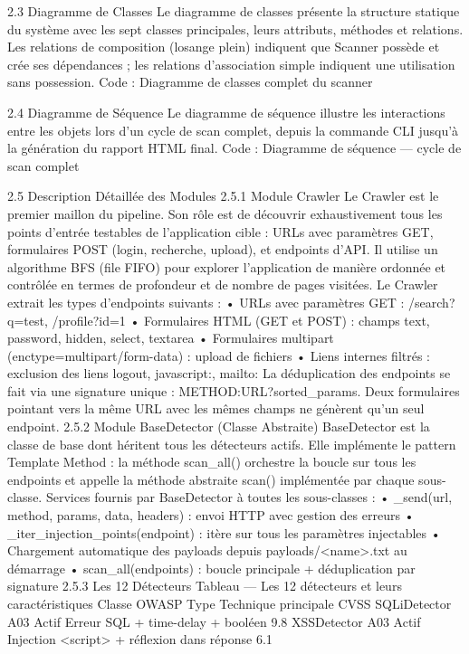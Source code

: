 2.3  Diagramme de Classes
Le diagramme de classes présente la structure statique du système avec les sept classes principales, leurs attributs, méthodes et relations. Les relations de composition (losange plein) indiquent que Scanner possède et crée ses dépendances ; les relations d'association simple indiquent une utilisation sans possession.
Code : Diagramme de classes complet du scanner
 
2.4  Diagramme de Séquence
Le diagramme de séquence illustre les interactions entre les objets lors d'un cycle de scan complet, depuis la commande CLI jusqu'à la génération du rapport HTML final.
Code : Diagramme de séquence — cycle de scan complet
 
2.5  Description Détaillée des Modules
2.5.1  Module Crawler
Le Crawler est le premier maillon du pipeline. Son rôle est de découvrir exhaustivement tous les points d'entrée testables de l'application cible : URLs avec paramètres GET, formulaires POST (login, recherche, upload), et endpoints d'API. Il utilise un algorithme BFS (file FIFO) pour explorer l'application de manière ordonnée et contrôlée en termes de profondeur et de nombre de pages visitées.
Le Crawler extrait les types d'endpoints suivants :
•	URLs avec paramètres GET : /search?q=test, /profile?id=1
•	Formulaires HTML (GET et POST) : champs text, password, hidden, select, textarea
•	Formulaires multipart (enctype=multipart/form-data) : upload de fichiers
•	Liens internes filtrés : exclusion des liens logout, javascript:, mailto:
La déduplication des endpoints se fait via une signature unique : METHOD:URL?sorted_params. Deux formulaires pointant vers la même URL avec les mêmes champs ne génèrent qu'un seul endpoint.
2.5.2  Module BaseDetector (Classe Abstraite)
BaseDetector est la classe de base dont héritent tous les détecteurs actifs. Elle implémente le pattern Template Method : la méthode scan_all() orchestre la boucle sur tous les endpoints et appelle la méthode abstraite scan() implémentée par chaque sous-classe.
Services fournis par BaseDetector à toutes les sous-classes :
•	_send(url, method, params, data, headers) : envoi HTTP avec gestion des erreurs
•	_iter_injection_points(endpoint) : itère sur tous les paramètres injectables
•	Chargement automatique des payloads depuis payloads/<name>.txt au démarrage
•	scan_all(endpoints) : boucle principale + déduplication par signature
2.5.3  Les 12 Détecteurs
Tableau — Les 12 détecteurs et leurs caractéristiques
Classe	OWASP	Type	Technique principale	CVSS
SQLiDetector	A03	Actif	Erreur SQL + time-delay + booléen	9.8
XSSDetector	A03	Actif	Injection <script> + réflexion dans réponse	6.1
